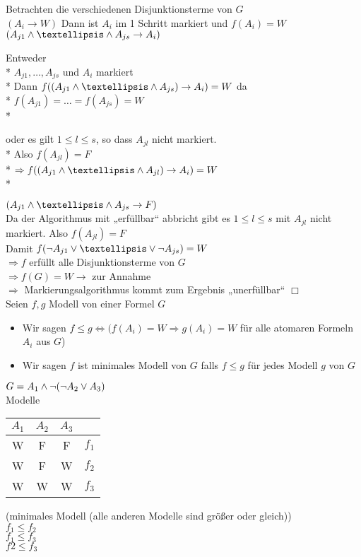 Betrachten die verschiedenen Disjunktionsterme von $G$\\
$(A_i \rightarrow W)$ Dann ist $A_i$ im 1 Schritt markiert und $f(A_i) = W$\\
$(A_{j1} \AND … \AND A_{js} \rightarrow A_i)$\\

\begin{minipage}{\textwidth}
Entweder\\*
$A_{j1}, …, A_{js}$ und $A_i$ markiert\\*
Dann $f((A_{j1} \AND … \AND A_{js}) \rightarrow A_i) = W$ da\\*
$f(A_{j1}) = … = f(A_{js})=W$\\*

oder es gilt $1 \leq l \leq s$, so dass $A_{jl}$ nicht markiert.\\*
Also $f(A_{jl}) = F$\\*
$\Rightarrow f((A_{j1} \AND … \AND A_{jl}) \rightarrow A_i) = W$\\*
\end{minipage}

$(A_{j1} \AND … \AND A_{js} \rightarrow F)$\\
Da der Algorithmus mit „erfüllbar“ abbricht gibt es $1 \leq l \leq s$ mit $A_{jl}$ nicht markiert. Also $f(A_{jl})=F$\\
Damit $f(\neg A_{j1} \OR … \OR \neg A_{js}) = W$\\
$\Rightarrow f$ erfüllt alle Disjunktionsterme von $G$\\
$\Rightarrow f(G) = W  \rightarrow$ \widerspruch zur Annahme\\
$\Rightarrow$ Markierungsalgorithmus kommt zum Ergebnis „unerfüllbar“ $\Box$\\

Seien $f,g$ Modell von einer Formel $G$
\begin{itemize}
\item Wir sagen $f \leq g \Leftrightarrow (f(A_i) = W \Rightarrow g(A_i) =W$ für alle atomaren Formeln $A_i$ aus $G$)

\item Wir sagen $f$ ist minimales Modell von $G$ falls $f \leq g$ für jedes Modell $g$ von $G$
\end{itemize}

\beispiel{}
$G = A_1 \wedge \neg (\neg A_2 \vee A_3)$\\
Modelle\\
\begin{tabular}{c|c|cr}
$A_1$ & $A_2$ & $A_3$ &  \\
\hline
W & F & F & $f_1$ \\
W & F & W & $f_2$ \\
W & W & W & $f_3$ \\
\end{tabular}
(minimales Modell (alle anderen Modelle sind größer oder gleich))\\
$f_1 \leq f_2$\\
$f_1 \leq f_3$\\
$f2 \leq f_3$\\

